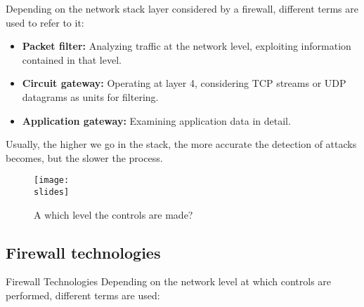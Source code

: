Depending on the network stack layer considered by a firewall, different terms are used to refer to it:
\begin{itemize}
    \item \textbf{Packet filter:} Analyzing traffic at the network level, exploiting information contained in that level.
    \item \textbf{Circuit gateway:} Operating at layer 4, considering TCP streams or UDP datagrams as units for filtering.
    \item \textbf{Application gateway:} Examining application data in detail.
\end{itemize}

Usually, the higher we go in the stack, the more accurate the detection of attacks becomes, but the slower the process.

\begin{figure}[h]
    \centering
    \texttt{[image: \\slides]}
    \caption{A which level the controls are made?}
\end{figure}


\subsection{Firewall technologies}
Firewall Technologies
Depending on the network level at which controls are performed, different terms are used:

